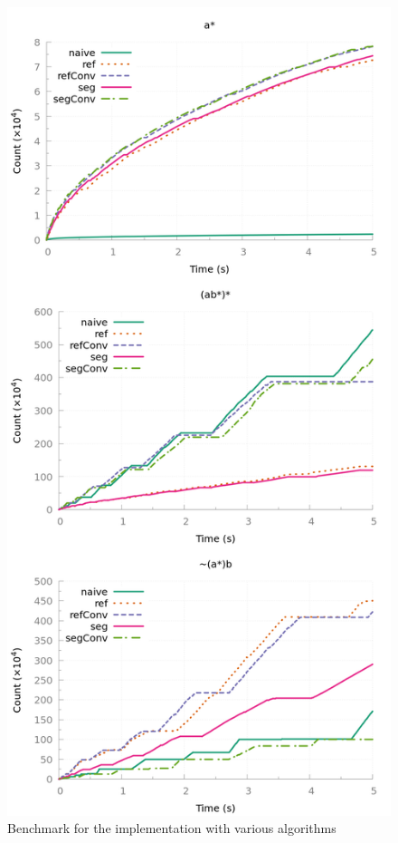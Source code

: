 \begin{figure}[!tp]
  \centering
  \includegraphics[width=\linewidth]{measure/haskell_all.png}
  \caption{Benchmark for the \haskell implementation with various algorithms}
  \label{bench:haskell:all}
\end{figure}
